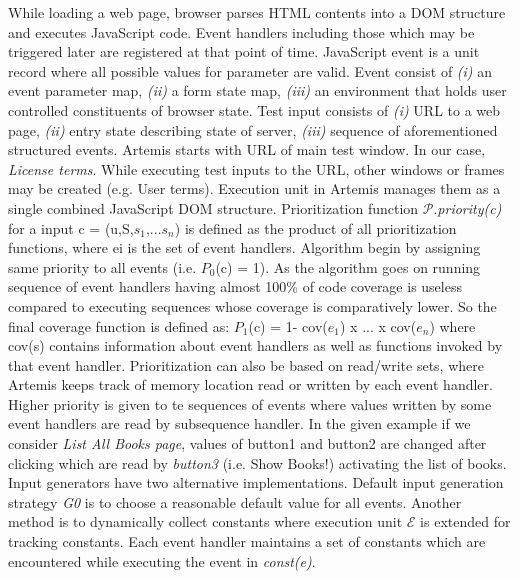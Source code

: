 \documentclass[authoryear,preprint, twocolumn]{sigplanconf}
\begin{document}
\newline While loading a web page, browser parses HTML contents into a DOM structure and executes JavaScript code. Event handlers including those which may be triggered later are registered at that point of time. JavaScript event is a unit record where all possible values for parameter are valid. Event consist of \emph{(i)} an event parameter map, \emph{(ii)} a form state map, \emph{(iii)} an environment that holds user controlled constituents of browser state. Test input consists of \emph{(i)} URL to a web page, \emph{(ii)} entry state describing state of server, \emph{(iii)} sequence of aforementioned structured events.
\newline Artemis starts with URL of main test window. In our case, \emph{License terms}. While executing test inputs to the URL, other windows or frames may be created (e.g. User terms). Execution unit in Artemis manages them as a single combined JavaScript DOM structure. 
\newline Prioritization function $\mathcal{P}$.\emph{priority(c)} for a input c = (u,S,$s_1$,...$s_n$) is defined as the product of all prioritization functions, where ei is the set of event handlers. Algorithm begin by assigning same priority to all events (i.e. $P_0$(c)  = 1). As the algorithm goes on running sequence of event handlers having almost 100\% of code coverage is useless compared to executing sequences whose coverage is comparatively lower. So the final coverage function is defined as:
$P_1$(c) = 1- cov($e_1$) x ... x cov($e_n$)
where cov(s) contains information about event handlers as well as functions invoked by that event handler.
\newline Prioritization can also be based on read/write sets, where Artemis keeps track  of memory location read or written by each event handler. Higher priority is given to te sequences of events where values written by some event handlers are read by subsequence handler. In the given example if we consider \emph{List All Books page}, values of button1 and button2 are changed after clicking which are read by \emph{button3} (i.e. Show Books!) activating the list of books.
\newline Input generators have two alternative implementations. Default input generation strategy \emph{G0} is to choose a reasonable default value for all events. Another method is to dynamically collect constants where execution unit $\mathcal{E}$ is extended for tracking constants. Each event handler maintains a set of constants which are encountered while executing the event in \emph{const(e)}.
\end{document}
